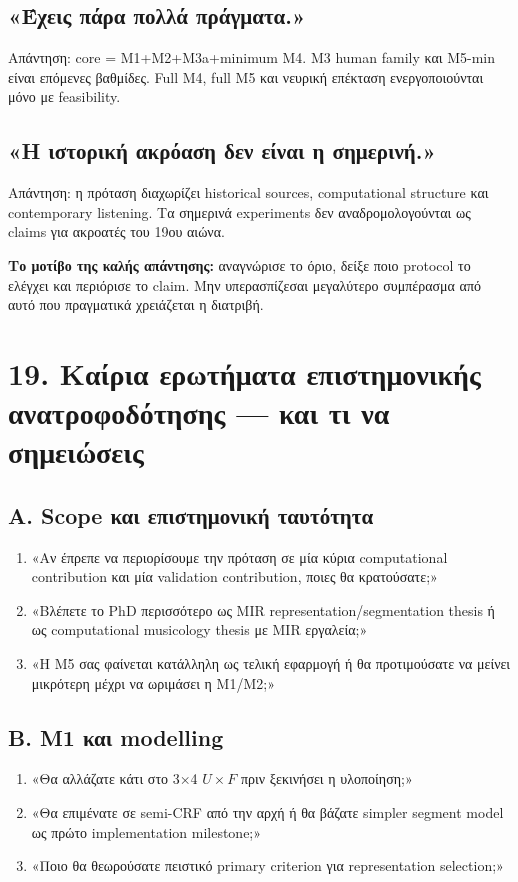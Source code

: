 \documentclass[9pt,a4paper]{extarticle}
\begin{document}
\subsection*{«Έχεις πάρα πολλά πράγματα.»}
Απάντηση: core = M1+M2+M3a+minimum M4. M3 human family και M5-min είναι επόμενες βαθμίδες. Full M4, full M5 και νευρική επέκταση ενεργοποιούνται μόνο με feasibility.

\subsection*{«Η ιστορική ακρόαση δεν είναι η σημερινή.»}
Απάντηση: η πρόταση διαχωρίζει historical sources, computational structure και contemporary listening. Τα σημερινά experiments δεν αναδρομολογούνται ως claims για ακροατές του 19ου αιώνα.

\begin{keybox}
\textbf{Το μοτίβο της καλής απάντησης:} αναγνώρισε το όριο, δείξε ποιο protocol το ελέγχει και περιόρισε το claim. Μην υπερασπίζεσαι μεγαλύτερο συμπέρασμα από αυτό που πραγματικά χρειάζεται η διατριβή.
\end{keybox}

\newpage
\section*{19. Καίρια ερωτήματα επιστημονικής ανατροφοδότησης — και τι να σημειώσεις}

\subsection*{Α. Scope και επιστημονική ταυτότητα}
\begin{enumerate}
\item «Αν έπρεπε να περιορίσουμε την πρόταση σε μία κύρια computational contribution και μία validation contribution, ποιες θα κρατούσατε;»
\item «Βλέπετε το PhD περισσότερο ως MIR representation/segmentation thesis ή ως computational musicology thesis με MIR εργαλεία;»
\item «Η M5 σας φαίνεται κατάλληλη ως τελική εφαρμογή ή θα προτιμούσατε να μείνει μικρότερη μέχρι να ωριμάσει η M1/M2;»
\end{enumerate}

\subsection*{Β. M1 και modelling}
\begin{enumerate}
\item «Θα αλλάζατε κάτι στο 3×4 \(U\times F\) πριν ξεκινήσει η υλοποίηση;»
\item «Θα επιμένατε σε semi-CRF από την αρχή ή θα βάζατε simpler segment model ως πρώτο implementation milestone;»
\item «Ποιο θα θεωρούσατε πειστικό primary criterion για representation selection;»
\end{enumerate}
\end{document}
